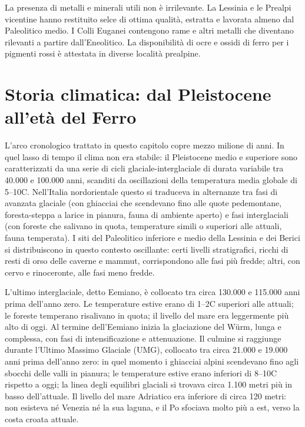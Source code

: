 La presenza di metalli e minerali utili non è irrilevante. La Lessinia e le Prealpi vicentine hanno restituito selce di ottima qualità, estratta e lavorata almeno dal Paleolitico medio. I Colli Euganei contengono rame e altri metalli che diventano rilevanti a partire dall'Eneolitico. La disponibilità di ocre e ossidi di ferro per i pigmenti rossi è attestata in diverse località prealpine.

\section{Storia climatica: dal Pleistocene all'età del Ferro}

L'arco cronologico trattato in questo capitolo copre mezzo milione di anni. In quel lasso di tempo il clima non era stabile: il Pleistocene medio e superiore sono caratterizzati da una serie di cicli glaciale-interglaciale di durata variabile tra 40.000 e 100.000 anni, scanditi da oscillazioni della temperatura media globale di 5--10\textdegree C. Nell'Italia nordorientale questo si traduceva in alternanze tra fasi di avanzata glaciale (con ghiacciai che scendevano fino alle quote pedemontane, foresta-steppa a larice in pianura, fauna di ambiente aperto) e fasi interglaciali (con foreste che salivano in quota, temperature simili o superiori alle attuali, fauna temperata). I siti del Paleolitico inferiore e medio della Lessinia e dei Berici si distribuiscono in questo contesto oscillante: certi livelli stratigrafici, ricchi di resti di orso delle caverne e mammut, corrispondono alle fasi più fredde; altri, con cervo e rinoceronte, alle fasi meno fredde.

L'ultimo interglaciale, detto Eemiano, è collocato tra circa 130.000 e 115.000 anni prima dell'anno zero. Le temperature estive erano di 1--2\textdegree C superiori alle attuali; le foreste temperano risalivano in quota; il livello del mare era leggermente più alto di oggi. Al termine dell'Eemiano inizia la glaciazione del Würm, lunga e complessa, con fasi di intensificazione e attenuazione. Il culmine si raggiunge durante l'Ultimo Massimo Glaciale (UMG), collocato tra circa 21.000 e 19.000 anni prima dell'anno zero: in quel momento i ghiacciai alpini scendevano fino agli sbocchi delle valli in pianura; le temperature estive erano inferiori di 8--10\textdegree C rispetto a oggi; la linea degli equilibri glaciali si trovava circa 1.100 metri più in basso dell'attuale. Il livello del mare Adriatico era inferiore di circa 120 metri: non esisteva né Venezia né la sua laguna, e il Po sfociava molto più a est, verso la costa croata attuale.

